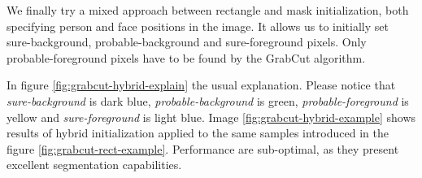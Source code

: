 We finally try a mixed approach between rectangle and mask initialization, both specifying person and face positions in the image. It allows us to initially set sure-background, probable-background and sure-foreground pixels. Only probable-foreground pixels have to be found by the GrabCut algorithm. 

In figure \ref{fig:grabcut-hybrid-explain} the usual explanation. Please notice that \textit{sure-background} is dark blue, \textit{probable-background} is green, \textit{probable-foreground} is yellow and \textit{sure-foreground} is light blue. 
Image \ref{fig:grabcut-hybrid-example} shows results of hybrid initialization applied to the same samples introduced in the figure \ref{fig:grabcut-rect-example}. Performance are sub-optimal, as they present excellent segmentation capabilities.


